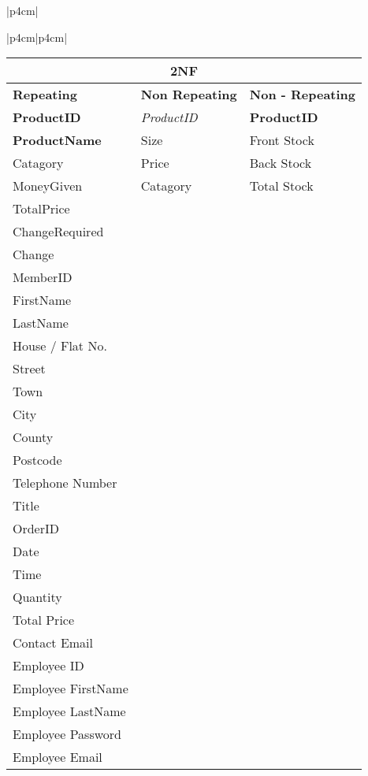 \begin{center}
\begin{tabular}{|p{4cm}|}
\begin{center}
\begin{tabular}{|p{4cm}|p{4cm}|}
\begin{center}
    \begin{tabular}{|p{4cm}|p{4cm}|p{4cm}|}
        \hline
	 \multicolumn{3}{|c|}{2NF} \\ \hline
	\textbf{Repeating} & \textbf{Non Repeating} & \textbf{Non - Repeating}\\ \hline
	\textbf{ProductID}  & \textit{ProductID} & \textbf{ProductID}\\ \hline
	\textbf{ProductName} & {Size} & {Front Stock}\\ \hline
	{Catagory} & {Price} & {Back Stock}\\ \hline
	{MoneyGiven} & {Catagory} & {Total Stock}\\ \hline
	{TotalPrice} & {}\\ \hline
	{ChangeRequired} & {}\\ \hline
	{Change} & {}\\ \hline
	{MemberID} & {}\\ \hline
	{FirstName} & {}\\ \hline
	{LastName} & {}\\ \hline
	{House / Flat No.} & {}\\ \hline
	{Street} & {}\\ \hline
	{Town} & {}\\ \hline
	{City} & {}\\ \hline
	{County} & {}\\ \hline
	{Postcode} & {}\\ \hline
	{Telephone Number} & {}\\ \hline
	{Title} & {}\\ \hline
	{OrderID} & {}\\ \hline
	{Date} & {}\\ \hline
	{Time} & {}\\ \hline
	{Quantity} & {}\\ \hline
	{Total Price} & {}\\ \hline
	{Contact Email} & {}\\ \hline
	{Employee ID} & {}\\ \hline
	{Employee FirstName} & {}\\ \hline
	{Employee LastName} & {}\\ \hline
	{Employee Password} & {}\\ \hline
	{Employee Email} & {}\\ \hline
    \end{tabular}
\end{center}


\end{tabular}
\end{center}
\end{tabular}
\end{center}
